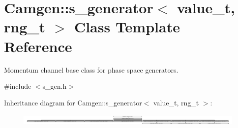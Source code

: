 \hypertarget{a00482}{\section{Camgen\-:\-:s\-\_\-generator$<$ value\-\_\-t, rng\-\_\-t $>$ Class Template Reference}
\label{a00482}
}


Momentum channel base class for phase space generators.  




{\ttfamily \#include $<$s\-\_\-gen.\-h$>$}

Inheritance diagram for Camgen\-:\-:s\-\_\-generator$<$ value\-\_\-t, rng\-\_\-t $>$\-:\begin{figure}[H]
\begin{center}
\leavevmode
\includegraphics[height=0.591497cm]{a00482}
\end{center}
\end{figure}
